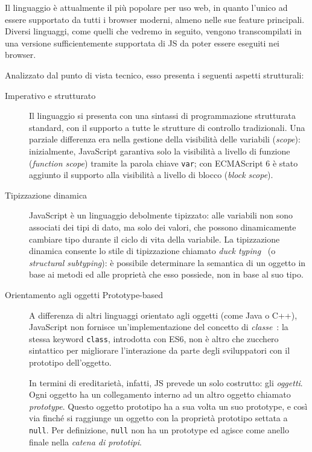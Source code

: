       Il linguaggio è attualmente il più popolare per uso web, in quanto l'unico ad essere supportato da tutti i browser moderni, almeno nelle sue feature principali.
      Diversi linguaggi, come quelli che vedremo in seguito, vengono transcompilati in una versione sufficientemente supportata di JS da poter essere eseguiti nei browser.

      Analizzato dal punto di vista tecnico, esso presenta i seguenti aspetti strutturali:

      \begin{description}
        \item[Imperativo e strutturato]
          Il linguaggio si presenta con una sintassi di programmazione strutturata standard, con il supporto a tutte le strutture di controllo tradizionali.
          Una parziale differenza era nella gestione della visibilità delle variabili (\emph{scope}):
          inizialmente, JavaScript garantiva solo la visibilità a livello di funzione (\emph{function scope}) tramite la parola chiave \texttt{var};
          con ECMAScript 6 è stato aggiunto il supporto alla visibilità a livello di blocco (\emph{block scope}).

        \item[Tipizzazione dinamica]
          JavaScript è un linguaggio debolmente tipizzato:
          alle variabili non sono associati dei tipi di dato, ma solo dei valori, che possono dinamicamente cambiare tipo durante il ciclo di vita della variabile.
          La tipizzazione dinamica consente lo stile di tipizzazione chiamato \emph{duck typing}~\cite{10.1145/2103621.2103686} (o \emph{structural subtyping}):
          è possibile determinare la semantica di un oggetto in base ai metodi ed alle proprietà che esso possiede,  non in base al suo tipo.

        \item[Orientamento agli oggetti Prototype-based]
          A differenza di altri linguaggi orientato agli oggetti (come Java o C++), JavaScript non fornisce un'implementazione del concetto di \emph{classe}~\cite{Ungar1991}:
          la stessa keyword \texttt{class}, introdotta con ES6, non è altro che zucchero sintattico per migliorare l'interazione da parte degli sviluppatori con il prototipo dell'oggetto.

          In termini di ereditarietà, infatti, JS prevede un solo costrutto: gli \emph{oggetti}.
          Ogni oggetto ha un collegamento interno ad un altro oggetto chiamato \emph{prototype}.
          Questo oggetto prototipo ha a sua volta un suo prototype, e così via finché si raggiunge un oggetto con la proprietà prototipo settata a \texttt{null}.
          Per definizione, \texttt{null} non ha un prototype ed agisce come anello finale nella \emph{catena di prototipi}.


\end{description}
